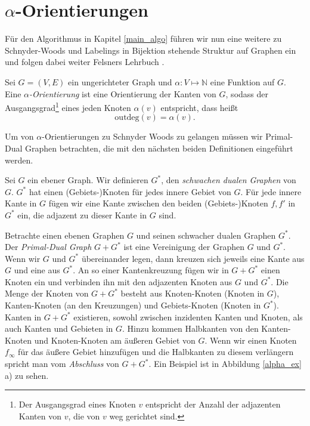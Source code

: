 \section{$\alpha$-Orientierungen}\label{alpha_orientations}

Für den Algorithmus in Kapitel \ref{main_algo} führen wir nun eine weitere zu Schnyder-Woods und Labelings in Bijektion stehende Struktur auf Graphen ein und folgen dabei weiter Felsners Lehrbuch \cite{felsner04}.

\begin{definition}
Sei $G=(V,E)$ ein ungerichteter Graph und $\alpha:V\mapsto\mathbb{N}$ eine Funktion auf $G$. Eine $\alpha$\textit{-Orientierung} ist eine Orientierung der Kanten von $G$, sodass der Ausgangsgrad\footnote{Der Ausgangsgrad eines Knoten $v$ entspricht der Anzahl der adjazenten Kanten von $v$, die von $v$ weg gerichtet sind.} eines jeden Knoten $\alpha(v)$ entspricht, dass heißt $$\text{outdeg}(v) = \alpha(v).$$
\end{definition}

Um von $\alpha$-Orientierungen zu Schnyder Woods zu gelangen müssen wir Primal-Dual Graphen betrachten, die mit den nächsten beiden Definitionen eingeführt werden.

\begin{definition}
Sei $G$ ein ebener Graph. Wir definieren $G^*$, den \textit{schwachen dualen Graphen} von $G$. $G^*$ hat einen (Gebiets-)Knoten für jedes innere Gebiet von $G$. Für jede innere Kante in $G$ fügen wir eine Kante zwischen den beiden (Gebiets-)Knoten $f,f'$ in $G^*$ ein, die adjazent zu dieser Kante in $G$ sind.
\end{definition}

\begin{definition}
Betrachte einen ebenen Graphen $G$ und seinen schwacher dualen Graphen $G^*$. Der \textit{Primal-Dual Graph} $G+G^*$ ist eine Vereinigung der Graphen $G$ und $G^*$. Wenn wir $G$ und $G^*$ übereinander legen, dann kreuzen sich jeweils eine Kante aus $G$ und eine aus $G^*$. An so einer Kantenkreuzung fügen wir in $G+G^*$ einen Knoten ein und verbinden ihn mit den adjazenten Knoten aus $G$ und $G^*$. Die Menge der Knoten von $G+G^*$ besteht aus Knoten-Knoten (Knoten in $G$), Kanten-Knoten (an den Kreuzungen) und Gebiets-Knoten (Knoten in $G^*$). Kanten in $G+G^*$ existieren, sowohl zwischen inzidenten Kanten und Knoten, als auch Kanten und Gebieten in $G$. Hinzu kommen Halbkanten von den Kanten-Knoten und Knoten-Knoten am äußeren Gebiet von $G$. Wenn wir einen Knoten $f_\infty$ für das äußere Gebiet hinzufügen und die Halbkanten zu diesem verlängern spricht man vom \textit{Abschluss} von $G+G^*$. Ein Beispiel ist in Abbildung \ref{alpha_ex} a) zu sehen.

\end{definition}

